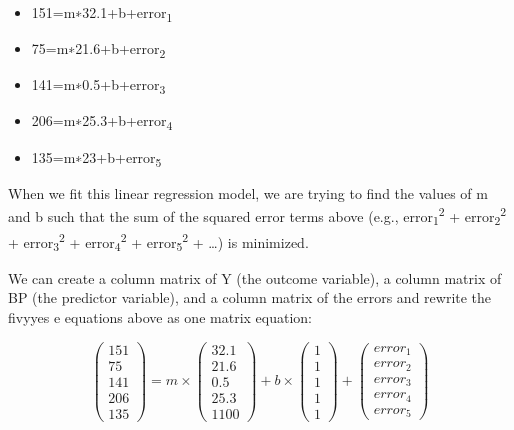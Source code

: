 \documentclass[11pt]{article}
\begin{document}
\begin{itemize}
\item 151=m∗32.1+b+error\textsubscript{1}
\item 75=m∗21.6+b+error\textsubscript{2}
\item 141=m∗0.5+b+error\textsubscript{3}
\item 206=m∗25.3+b+error\textsubscript{4}
\item 135=m∗23+b+error\textsubscript{5}
\end{itemize}

When we fit this linear regression model, we are trying to find the values of m and b such that the sum of the squared error terms above (e.g., error\textsubscript{1}\textsuperscript{2} + error\textsubscript{2}\textsuperscript{2} + error\textsubscript{3}\textsuperscript{2} + error\textsubscript{4}\textsuperscript{2} + error\textsubscript{5}\textsuperscript{2} + \ldots{}) is minimized.

We can create a column matrix of Y (the outcome variable), a column matrix of BP (the predictor variable), and a column matrix of the errors and rewrite the fivyyes
e equations above as one matrix equation:

\begin{equation*}

\begin{pmatrix}
151 \\
75 \\
141 \\
206 \\
135
\end{pmatrix}
= m \times
\begin{pmatrix}
32.1 \\
21.6 \\
0.5 \\
25.3 \\
1100
\end{pmatrix}
+ b \times
\begin{pmatrix}
1 \\
1 \\
1 \\
1 \\
1
\end{pmatrix}
+
\begin{pmatrix}
error_1 \\
error_2 \\
error_3 \\
error_4 \\
error_5
\end{pmatrix}
\end{equation*}\\
\end{document}
